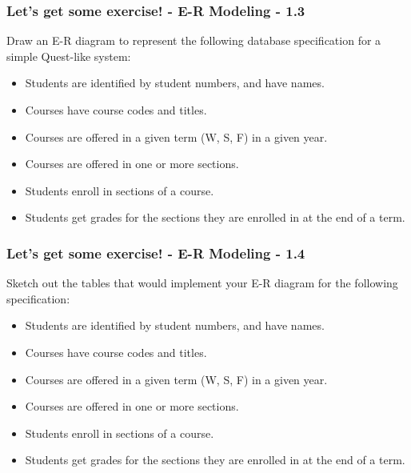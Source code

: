 \begin{frame}
\frametitle{Let's get some exercise! - E-R Modeling - 1.3}

Draw an E-R diagram to represent the following database specification for a simple Quest-like system:\\
\begin{itemize}
  \item Students are identified by student numbers, and have names.
  \item Courses have course codes and titles.
  \item Courses are offered in a given term (W, S, F) in a given year.
  \item Courses are offered in one or more sections.
  \item Students enroll in sections of a course.
  \item Students get grades for the sections they are enrolled in at the end of a term.
\end{itemize}

\end{frame}


\begin{frame}
\frametitle{Let's get some exercise! - E-R Modeling - 1.4}

Sketch out the tables that would implement your E-R diagram for the following specification:\\
\begin{itemize}
  \item Students are identified by student numbers, and have names.
  \item Courses have course codes and titles.
  \item Courses are offered in a given term (W, S, F) in a given year.
  \item Courses are offered in one or more sections.
  \item Students enroll in sections of a course.
  \item Students get grades for the sections they are enrolled in at the end of a term.
\end{itemize}

\end{frame}


